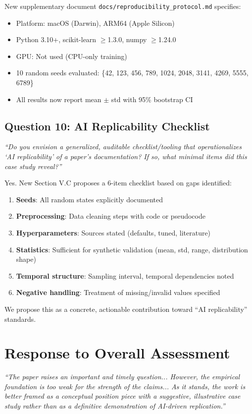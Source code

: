 \documentclass[11pt]{article}
\newcommand{\reviewer}[1]{\textcolor{reviewercolor}{\textit{#1}}}
\newcommand{\response}[1]{\textcolor{responsecolor}{#1}}
\begin{document}
\response{New supplementary document \texttt{docs/reproducibility\_protocol.md} specifies:
\begin{itemize}
    \item Platform: macOS (Darwin), ARM64 (Apple Silicon)
    \item Python 3.10+, scikit-learn $\geq$1.3.0, numpy $\geq$1.24.0
    \item GPU: Not used (CPU-only training)
    \item 10 random seeds evaluated: \{42, 123, 456, 789, 1024, 2048, 3141, 4269, 5555, 6789\}
    \item All results now report mean $\pm$ std with 95\% bootstrap CI
\end{itemize}
}

\subsection*{Question 10: AI Replicability Checklist}

\reviewer{``Do you envision a generalized, auditable checklist/tooling that operationalizes `AI replicability' of a paper's documentation? If so, what minimal items did this case study reveal?''}

\response{Yes. New Section V.C proposes a 6-item checklist based on gaps identified:
\begin{enumerate}
    \item \textbf{Seeds}: All random states explicitly documented
    \item \textbf{Preprocessing}: Data cleaning steps with code or pseudocode
    \item \textbf{Hyperparameters}: Sources stated (defaults, tuned, literature)
    \item \textbf{Statistics}: Sufficient for synthetic validation (mean, std, range, distribution shape)
    \item \textbf{Temporal structure}: Sampling interval, temporal dependencies noted
    \item \textbf{Negative handling}: Treatment of missing/invalid values specified
\end{enumerate}
We propose this as a concrete, actionable contribution toward ``AI replicability'' standards.
}

\section*{Response to Overall Assessment}

\reviewer{``The paper raises an important and timely question... However, the empirical foundation is too weak for the strength of the claims... As it stands, the work is better framed as a conceptual position piece with a suggestive, illustrative case study rather than as a definitive demonstration of AI-driven replication.''}
\end{document}
